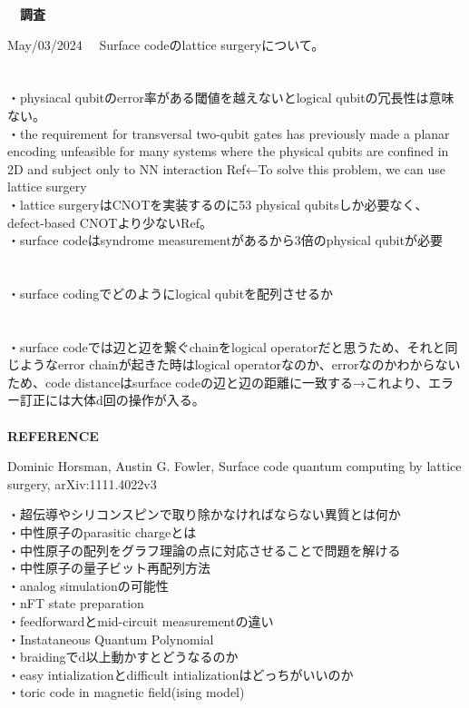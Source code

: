 \documentclass[a4paper,10.5pt]{ltjsarticle}
\begin{document}
\centerline
{\huge \bfseries　調査}
\rightline
{May/03/2024}
\leftline
{}
　Surface codeのlattice surgeryについて。\\
\\
\\
・physiacal qubitのerror率がある閾値を越えないとlogical qubitの冗長性は意味ない。\\
・the requirement for transversal two-qubit gates has previously made a planar encoding unfeasible for many systems where the physical qubits are confined in 2D and subject only to NN interaction Ref\cite{1}←To solve this problem, we can use lattice surgery\\
・lattice surgeryはCNOTを実装するのに53 physical qubitsしか必要なく、defect-based CNOTより少ないRef\cite{1}。\\
・surface codeはsyndrome measurementがあるから3倍のphysical qubitが必要\\
\\
\\
・surface codingでどのようにlogical qubitを配列させるか\\
\\
\\
・surface codeでは辺と辺を繋ぐchainをlogical operatorだと思うため、それと同じようなerror chainが起きた時はlogical operatorなのか、errorなのかわからないため、code distanceはsurface codeの辺と辺の距離に一致する→これより、エラー訂正には大体d回の操作が入る。\\
\\
{\Large \bfseries REFERENCE}
\begin{thebibliography}{1}
\vspace{-1.5cm}
   Dominic Horsman, Austin G. Fowler, Surface code quantum computing by lattice surgery, arXiv:1111.4022v3
\end{thebibliography}
・超伝導やシリコンスピンで取り除かなければならない異質とは何か\\
・中性原子のparasitic chargeとは\\
・中性原子の配列をグラフ理論の点に対応させることで問題を解ける\\
・中性原子の量子ビット再配列方法\\
・analog simulationの可能性\\
・nFT state preparation\\
・feedforwardとmid-circuit measurementの違い\\
・Instataneous Quantum Polynomial\\
・braidingでd以上動かすとどうなるのか\\
・easy intializationとdifficult intializationはどっちがいいのか\\
・toric code in magnetic field(ising model)\\
\\
\end{document}
